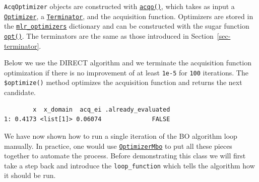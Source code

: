 \texttt{AcqOptimizer} objects are constructed with
\href{https://mlr3mbo.mlr-org.com/reference/acqo.html}{\texttt{acqo()}},
which takes as input a
\href{https://bbotk.mlr-org.com/reference/Optimizer.html}{\texttt{Optimizer}},
a
\href{https://bbotk.mlr-org.com/reference/Terminator.html}{\texttt{Terminator}},
and the acquisition function. Optimizers are stored in the
\href{https://bbotk.mlr-org.com/reference/mlr_optimizers.html}{\texttt{mlr\_optimizers}}
dictionary and can be constructed with the sugar function
\href{https://bbotk.mlr-org.com/reference/opt.html}{\texttt{opt()}}.
The terminators are the same as those introduced in
Section~\ref{sec-terminator}.

Below we use the DIRECT algorithm and we terminate the acquisition
function optimization if there is no improvement of at least
\texttt{1e-5} for \texttt{100} iterations. The \texttt{\$optimize()}
method optimizes the acquisition function and returns the next
candidate.

\begin{Shaded}
\begin{Highlighting}[]
\OtherTok{=} \NormalTok{(}
   \NormalTok{(}\NormalTok{, } \NormalTok{),}
   \NormalTok{(}\NormalTok{, } \NormalTok{, } \NormalTok{),}
\NormalTok{)}

\OtherTok{=}\SpecialCharTok{$}\NormalTok{()}
\end{Highlighting}
\end{Shaded}

\begin{verbatim}
        x  x_domain  acq_ei .already_evaluated
1: 0.4173 <list[1]> 0.06074              FALSE
\end{verbatim}

We have now shown how to run a single iteration of the BO algorithm loop
manually. In practice, one would use
\href{https://mlr3mbo.mlr-org.com/reference/mlr_optimizers_mbo.html}{\texttt{OptimizerMbo}}
to put all these pieces together to automate the process. Before
demonstrating this class we will first take a step back and introduce
the \texttt{loop\_function} which tells the algorithm how it should be
run.

